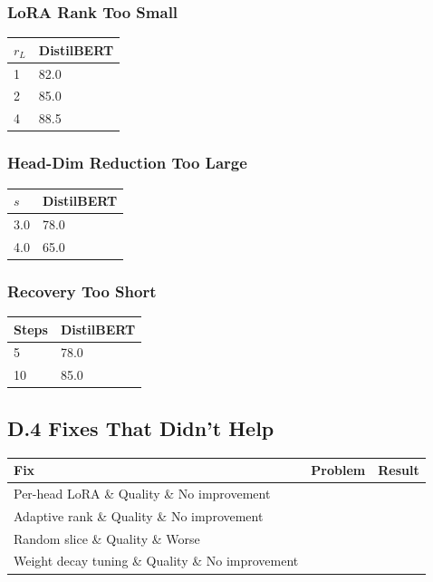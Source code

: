 \subsubsection{LoRA Rank Too Small}
\begin{table}[H]
\centering
\small
\begin{tabular}{ll}
\toprule
\textbf{$r_L$} & \textbf{DistilBERT} \\
\midrule
1 & 82.0 \\
2 & 85.0 \\
4 & 88.5 \\
\bottomrule
\end{tabular}
\end{table}

\subsubsection{Head-Dim Reduction Too Large}
\begin{table}[H]
\centering
\small
\begin{tabular}{ll}
\toprule
\textbf{$s$} & \textbf{DistilBERT} \\
\midrule
3.0 & 78.0 \\
4.0 & 65.0 \\
\bottomrule
\end{tabular}
\end{table}

\subsubsection{Recovery Too Short}
\begin{table}[H]
\centering
\small
\begin{tabular}{ll}
\toprule
\textbf{Steps} & \textbf{DistilBERT} \\
\midrule
5 & 78.0 \\
10 & 85.0 \\
\bottomrule
\end{tabular}
\end{table}

\subsection{D.4 Fixes That Didn't Help}

\begin{table}[H]
\centering
\small
\begin{tabular}{lll}
\toprule
\textbf{Fix} & \textbf{Problem} & \textbf{Result} \\
\midrule
Per-head LoRA \& Quality \& No improvement \\
Adaptive rank \& Quality \& No improvement \\
Random slice \& Quality \& Worse \\
Weight decay tuning \& Quality \& No improvement \\
\bottomrule
\end{tabular}
\end{table}

